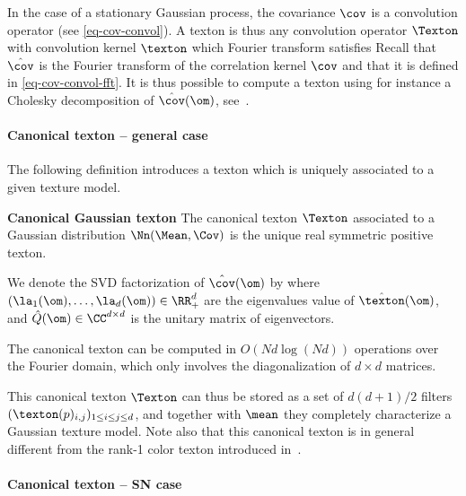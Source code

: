 In the case of a stationary Gaussian process, the covariance $\cov$ is a convolution operator (see \eqref{eq-cov-convol}). A texton is thus any convolution operator $\Texton$ with convolution kernel $\texton$ which Fourier transform satisfies 
Recall that $\hat \cov$ is the Fourier transform of the correlation kernel $\cov$ and that it is defined in \eqref{eq-cov-convol-fft}. It is thus possible to compute a texton using for instance a Cholesky decomposition of $\hat \cov(\om)$, see~\cite{Gentle}.

\paragraph{Canonical texton -- general case}

The following definition introduces a texton which is uniquely associated to a given texture model.

\begin{definition}{\bf Canonical Gaussian texton}
	The canonical texton $\Texton$ associated to a Gaussian distribution $\Nn(\Mean,\Cov)$ is the unique real symmetric positive texton.
\end{definition}

We denote the SVD factorization of $\hat \cov(\om)$ by
where $(\la_1(\om),\ldots,\la_d(\om)) \in \RR_+^d$ are the eigenvalues value of $\hat \texton(\om)$, and $\hat Q(\om) \in \CC^{d \times d}$ is the unitary matrix of eigenvectors.


The canonical texton can be computed in $O(Nd\log(Nd))$ operations over the Fourier domain, 
which only involves the diagonalization of $d \times d$ matrices. 

This canonical texton $\Texton$ can thus be stored as a set of $d(d+1)/2$ filters $(\texton(p)_{i,j})_{1 \leq i \leq j \leq d}$, and together with $\mean$ they completely characterize a Gaussian texture model.   Note also that this canonical texton is in general different from the rank-1 color texton introduced in~\cite{}.


\paragraph{Canonical texton -- SN case}

